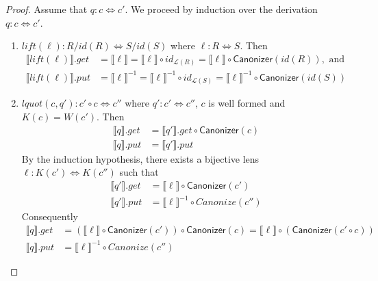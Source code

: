 \documentclass{svproc}
\newcommand{\kw}[1]{\ensuremath{\mathsf{#1}}}
\newcommand{\canonizer}{\ensuremath{\kw{Canonizer}}}
\begin{document}
\begin{proof}
Assume that $q : c \Leftrightarrow c'$. We proceed by induction over the
derivation $q : c \Leftrightarrow c'$.
\begin{enumerate}
  \item
  $\mathit{lift}(\ell): R/\mathit{id}(R) \Leftrightarrow S/\mathit{id}(S)$ where
  $\ell :
  R \Leftrightarrow S$. Then
  \begin{align*}
  \llbracket \mathit{lift}(\ell) \rrbracket.get &=  \llbracket \ell \rrbracket
  = \llbracket \ell \rrbracket \circ id_{\mathcal{L}(R)} =
  \llbracket \ell \rrbracket \circ \canonizer(\mathit{id}(R)), \text{ and }\\
  \llbracket \mathit{lift}(\ell) \rrbracket.put &= \llbracket \ell
  \rrbracket^{-1} = \llbracket \ell \rrbracket^{-1} \circ id_{\mathcal{L}(S)} =
  \llbracket \ell \rrbracket^{-1} \circ \canonizer(id(S))
  \end{align*}
  \item
  $\mathit{lquot}(c, q'): c' \circ c \Leftrightarrow c''$ where $q' : c' 
  \Leftrightarrow c''$, $c$ is well formed and $K(c) = W(c')$. Then
\begin{align*}
  \llbracket q \rrbracket.get  &= \llbracket q'
  \rrbracket.get \circ \canonizer(c)\\
  \llbracket q \rrbracket.put &= \llbracket q' \rrbracket.put
  \end{align*}
  By the induction hypothesis, there exists a bijective lens $\ell :
  K(c') \Leftrightarrow K(c'')$ such that 
  \begin{align*}
\llbracket q' \rrbracket.get &= \llbracket \ell \rrbracket \circ \canonizer(c')\\
\llbracket q' \rrbracket.put &= \llbracket \ell \rrbracket^{-1} \circ
Canonize(c'')
\end{align*}
Consequently
\begin{align*}
  \llbracket q \rrbracket.get  &= (\llbracket \ell \rrbracket \circ
  \canonizer(c')) \circ \canonizer(c) = \llbracket \ell \rrbracket \circ
  (\canonizer(c' \circ c))\\
  \llbracket q \rrbracket.put &= \llbracket \ell \rrbracket^{-1} \circ
  Canonize(c'')
  \end{align*}


\end{enumerate}
\end{proof}
\end{document}
